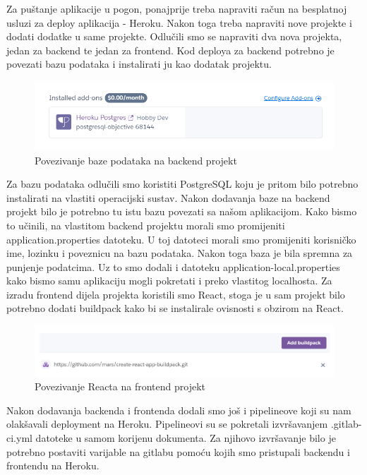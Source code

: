 Za puštanje aplikacije u pogon, ponajprije treba napraviti račun na besplatnoj usluzi za deploy aplikacija - Heroku.
Nakon toga treba napraviti nove projekte i dodati dodatke u same projekte. Odlučili smo se napraviti dva nova projekta, jedan za backend te jedan za frontend.
Kod deploya za backend potrebno je povezati bazu podataka i instalirati ju kao dodatak projektu.
\begin{figure}[H]
	\includegraphics[width=\linewidth]{slike/heroku-backend.png}
	\centering
	\caption{Povezivanje baze podataka na backend projekt}
	\label{fig:postgresqlbackend}
\end{figure}
Za bazu podataka odlučili smo koristiti PostgreSQL koju je pritom bilo potrebno instalirati na vlastiti operacijski sustav. Nakon dodavanja baze na backend projekt bilo je potrebno tu istu bazu povezati sa našom aplikacijom. Kako bismo to učinili, na vlastitom backend projektu morali smo promijeniti application.properties datoteku. U toj datoteci morali smo promijeniti korisničko ime, lozinku i poveznicu na bazu podataka. Nakon toga baza je bila spremna za punjenje podatcima. Uz to smo dodali i datoteku application-local.properties kako bismo samu aplikaciju mogli pokretati i preko vlastitog localhosta. 
Za izradu frontend dijela projekta koristili smo React, stoga je u sam projekt bilo potrebno dodati buildpack kako bi se instalirale ovisnosti s obzirom na React.
\begin{figure}[H]
	\includegraphics[width=\linewidth]{slike/heroku-frontend.png}
	\centering
	\caption{Povezivanje Reacta na frontend projekt}
	\label{fig:reactfrontend}
\end{figure}
Nakon dodavanja backenda i frontenda dodali smo još i pipelineove koji su nam olakšavali deployment na Heroku. Pipelineovi su se pokretali izvršavanjem .gitlab-ci.yml datoteke u samom korijenu dokumenta. Za njihovo izvršavanje bilo je potrebno postaviti varijable na gitlabu pomoću kojih smo pristupali backendu i frontendu na Heroku.
